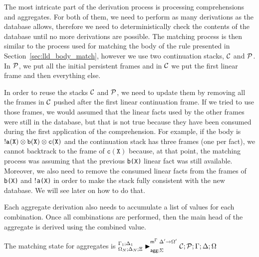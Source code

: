 The most intricate part of the derivation process is processing comprehensions
and aggregates. For both of them, we need to perform as many derivations as the
database allows, therefore we need to deterministically check the contents of
the database until no more derivations are possible.  The matching process is
then similar to the process used for matching the body of the rule presented in
Section~\ref{sec:lld_body_match}, however we use two continuation stacks,
$\lstack{C}$ and $\lstack{P}$. In $\lstack{P}$, we put all the initial
persistent frames and in $\lstack{C}$ we put the first linear frame and then
everything else.

In order to reuse the stacks $\lstack{C}$ and $\lstack{P}$, we need to update
them by removing all the frames in $\lstack{C}$ pushed after the first linear
continuation frame.  If we tried to use those frames, we would assumed that the
linear facts used by the other frames were still in the database, but that is
not true because they have been consumed during the first application of the
comprehension.  For example, if the body is $\bang \mathtt{a(X)} \otimes
\mathtt{b(X)} \otimes \mathtt{c(X)}$ and the continuation stack has three frames
(one per fact), we cannot backtrack to the frame of $\mathtt{c(X)}$ because, at
that point, the matching process was assuming that the previous \texttt{b(X)}
linear fact was still available.  Moreover, we also need to remove the consumed
linear facts from the frames of \texttt{b(X)} and $\bang$\texttt{a(X)} in order
to make the stack fully consistent with the new database. We will see later on
how to do that.

Each aggregate derivation also needs to accumulate a list of values for each
combination. Once all combinations are performed, then the main head of the
aggregate is derived using the combined value.

The matching state for aggregates is 
$\matstatea{\Delta_N}{\lstack{C};
   \lstack{P}}{\Gamma}{\Delta}{\Omega}{\Delta' \rightarrow \Omega'}{\Sigma}$

